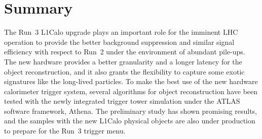 \section{Summary}
The Run~3 L1Calo upgrade plays an important role for the imminent LHC operation to provide the better background suppression and similar signal efficiency with respect to Run~2 under the environment of abundant pile-ups. The new hardware provides a better granularity and a longer latency for the object reconstruction, and it also grants the flexibility to capture some exotic signatures like the long-lived particles. To make the best use of the new hardware calorimeter trigger system, several algorithms for object reconstruction have been tested with the newly integrated trigger tower simulation under the ATLAS software framework, Athena. The preliminary study has shown promising results, and the samples with the new L1Calo physical objects are also under production to prepare for the Run~3 trigger menu. 
